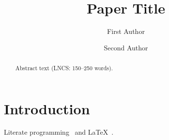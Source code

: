 \documentclass[runningheads]{llncs}
\begin{document}
\title{Paper Title}
\author{First Author \and Second Author}
\maketitle
\begin{abstract}
Abstract text (LNCS: 150--250 words).
\end{abstract}
\section{Introduction}
Literate programming~\cite{knuth1984literate} and \LaTeX~\cite{lamport1994latex}.


\end{document}
